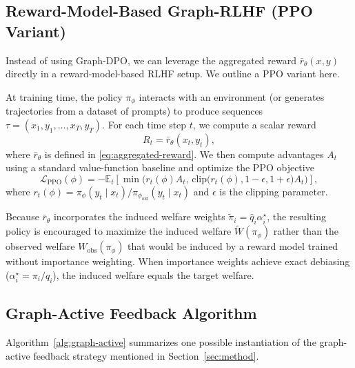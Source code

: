 \documentclass{article}
\theoremstyle{plain}
\theoremstyle{definition}
\theoremstyle{remark}
\begin{document}
\subsection{Reward-Model-Based Graph-RLHF (PPO Variant)}
\label{app:ppo}

Instead of using Graph-DPO, we can leverage the aggregated reward
$\bar r_\theta(x,y)$ directly in a reward-model-based RLHF setup. We outline
a PPO variant here.

At training time, the policy $\pi_\phi$ interacts with an environment (or
generates trajectories from a dataset of prompts) to produce sequences
$\tau = (x_1, y_1, \dots, x_T, y_T)$. For each time step $t$, we compute a
scalar reward
\begin{equation}
    R_t = \bar r_\theta(x_t, y_t),
\end{equation}
where $\bar r_\theta$ is defined in \eqref{eq:aggregated-reward}. We then
compute advantages $A_t$ using a standard value-function baseline and optimize
the PPO objective
\begin{equation}
    \mathcal{L}_{\text{PPO}}(\phi)
    =
    - \mathbb{E}_t
    \left[
    \min\Big(
        r_t(\phi) A_t,\,
        \text{clip}\big(r_t(\phi), 1 - \epsilon, 1 + \epsilon\big) A_t
    \Big)
    \right],
\end{equation}
where $r_t(\phi) = \pi_\phi(y_t \mid x_t) / \pi_{\phi_{\text{old}}}(y_t \mid x_t)$
and $\epsilon$ is the clipping parameter.

Because $\bar r_\theta$ incorporates the induced welfare weights
$\tilde\pi_i = \hat q_i \alpha_i^\star$, the resulting policy is encouraged
to maximize the induced welfare $\widetilde{W}(\pi_\phi)$ rather than the
observed welfare $W_{\text{obs}}(\pi_\phi)$ that would be induced by a
reward model trained without importance weighting. When importance weights
achieve exact debiasing ($\alpha_i^\star = \pi_i / q_i$), the induced welfare
equals the target welfare.

\subsection{Graph-Active Feedback Algorithm}
\label{app:active}

Algorithm~\ref{alg:graph-active} summarizes one possible instantiation of the
graph-active feedback strategy mentioned in Section~\ref{sec:method}.
\end{document}

